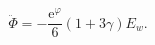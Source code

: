 \begin{equation}
\ddot\Phi
   = - \frac{\mathrm{e}^\varphi}{6}  
       \left( 1+ 3\gamma
       \right) E_w.
\label{eq:crossing_condition}
\end{equation}

